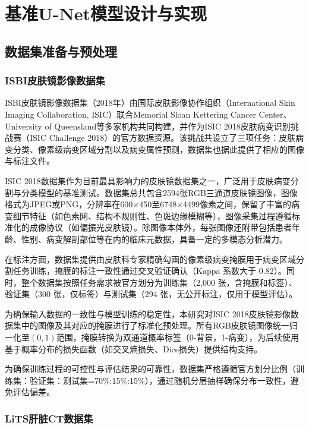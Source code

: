 \section{基准U-Net模型设计与实现}

\subsection{数据集准备与预处理}

\subsubsection{ISBI皮肤镜影像数据集}

ISBI皮肤镜影像数据集（2018年）由国际皮肤影像协作组织（International Skin Imaging Collaboration, ISIC）联合Memorial Sloan Kettering Cancer Center、University of Queensland等多家机构共同构建，并作为ISIC 2018皮肤病变识别挑战赛（ISIC Challenge 2018）的官方数据资源\cite{codella2019skinlesionanalysismelanoma}。该挑战共设立了三项任务：皮肤病变分类、像素级病变区域分割以及病变属性预测，数据集也据此提供了相应的图像与标注文件。

ISIC 2018数据集作为目前最具影响力的皮肤镜数据集之一，广泛用于皮肤病变分割与分类模型的基准测试。数据集总共包含2594张RGB三通道皮肤镜图像，图像格式为JPEG或PNG，分辨率在600×450至6748×4499像素之间，保留了丰富的病变细节特征（如色素网、结构不规则性、色斑边缘模糊等），图像采集过程遵循标准化的成像协议（如偏振光皮肤镜）。除图像本体外，每张图像还附带包括患者年龄、性别、病变解剖部位等在内的临床元数据，具备一定的多模态分析潜力。

在标注方面，数据集提供由皮肤科专家精确勾画的像素级病变掩膜用于病变区域分割任务训练，掩膜的标注一致性通过交叉验证确认（Kappa 系数大于 0.82）。同时，整个数据集按照任务需求被官方划分为训练集（2,000 张，含掩膜和标签）、验证集（300 张，仅标签）与测试集（294 张，无公开标注，仅用于模型评估）。

为确保输入数据的一致性与模型训练的稳定性，本研究对ISIC 2018皮肤镜影像数据集中的图像及其对应的掩膜进行了标准化预处理。所有RGB皮肤镜图像统一归一化至$(0,1)$范围，掩膜转换为双通道概率标签（0-背景，1-病变），为后续使用基于概率分布的损失函数（如交叉熵损失、Dice损失）提供结构支持。

为确保训练过程的可控性与评估结果的可靠性，数据集严格遵循官方划分比例（训练集：验证集：测试集=70\%:15\%:15\%），通过随机分层抽样确保分布一致性，避免评估偏差。

\subsubsection{LiTS肝脏CT数据集}

